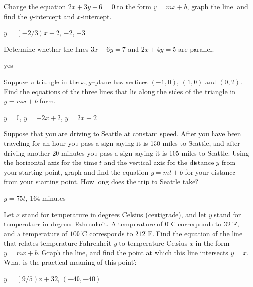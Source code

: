 \begin{exercises}
\begin{exercise} Change the equation $2x+3y+6=0$ to the form $y=mx+b$, graph the
line, and find the $y$-intercept and $x$-intercept.
\begin{answer} $y=(-2/3)x-2$, $-2$, $-3$
\end{answer}\end{exercise}

\begin{exercise} Determine whether the lines $3x+6y=7$ and $2x+4y=5$ are parallel.
\begin{answer} yes
\end{answer}\end{exercise}

\begin{exercise} Suppose a triangle in the $x,y$--plane has vertices $(-1,0)$,
$(1,0)$ and $(0,2)$.  Find the equations of the three lines that lie along
 the sides of the triangle in $y=mx+b$ form.
\begin{answer} $y=0$, $y=-2x+2$, $y=2x+2$
\end{answer}\end{exercise}

\begin{exercise} Suppose that you are driving to Seattle at constant speed.
After you have been traveling for an hour you pass a sign saying it is
130 miles to Seattle, and after driving another 20 minutes you pass a
sign saying it is 105 miles to Seattle.  Using the horizontal axis for
the time $t$ and the vertical axis for the distance $y$ from your
starting point, graph and find the equation $y=mt+b$ for your distance
from your starting point. How long does the trip to Seattle take?
\begin{answer} $y=75t$, 164 minutes
\end{answer}\end{exercise}


\begin{exercise}
Let $x$ stand for temperature in degrees Celsius (centigrade), and let
$y$ stand for temperature in degrees Fahrenheit.  A temperature of $0^\circ$C
corresponds to $32^\circ$F, and a temperature of
$100^\circ$C corresponds to $212^\circ$F.  Find the
equation of the line that relates temperature Fahrenheit $y$ to
temperature Celsius $x$ in the form $y=mx+b$.  
Graph the line, and find the point at which this line intersects $y=x$.
What is the practical meaning of this point?
\begin{answer} $y=(9/5)x+32$, $(-40,-40)$
\end{answer}\end{exercise}


\end{exercises}
